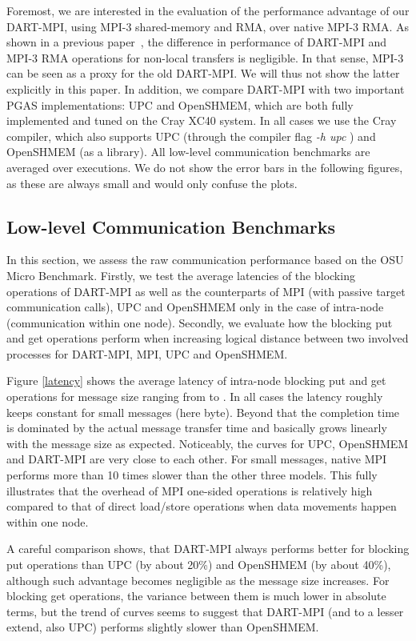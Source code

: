 \documentclass{llncs}
\newcommand{\MPI}[1]{\mbox{MPI-#1}\xspace}
\begin{document}
{Foremost, we are interested in the evaluation of the performance advantage of
our DART-MPI, using \MPI3 shared-memory and RMA, over native \MPI3
RMA. As shown in a previous paper~\cite{dart-mpi}, the
difference in performance of DART-MPI and MPI-3 RMA operations for non-local
transfers is negligible. In that sense, MPI-3 can be seen as a proxy
for the old DART-MPI. We will thus not show the latter explicitly in this paper.
In addition, we compare \mbox{DART-MPI} with two important PGAS implementations: UPC and OpenSHMEM, 
which are both fully implemented and tuned on the Cray XC40 system. 
In all cases we use the Cray compiler, which also supports UPC
(through the compiler flag \textit{-h upc} ) and OpenSHMEM (as a
library). 
All low-level communication benchmarks are averaged over  executions.
We do not show the error bars in the following figures, as these
are always small and would only confuse the plots.

\subsection{Low-level Communication Benchmarks}
In this section, we assess the raw communication performance based on the OSU Micro Benchmark\cite{osu_benchmark}.
Firstly, we test the average latencies of the blocking operations of \mbox{DART-MPI} 
as well as the counterparts of MPI (with passive target communication calls), UPC and OpenSHMEM\cite{openshmem} only in the case of intra-node (communication within one node).
Secondly, we evaluate how the blocking put and get operations perform when increasing
logical distance between two involved processes for DART-MPI, MPI, UPC and OpenSHMEM.

Figure \ref{latency} shows the average latency of intra-node blocking
put and get operations for message size ranging from  to
. In all cases the latency roughly keeps constant for small
messages (here  byte). Beyond that the completion time is
dominated by the actual message transfer time and basically grows
linearly with the message size as expected. Noticeably, the curves for
UPC, OpenSHMEM and DART-MPI are very close to each other. For small
messages, native MPI performs more than 10 times slower than the other three
models. This fully illustrates that the overhead of MPI one-sided
operations is relatively high compared to that of direct load/store operations
when data movements happen within one node.

A careful comparison shows, that DART-MPI always performs better for
blocking put operations than UPC (by about 20\%) and OpenSHMEM (by
about 40\%), although such advantage becomes negligible as the message
size increases. For blocking get operations, the variance between
them is much lower in absolute terms, but the trend of curves seems to
suggest that DART-MPI (and to a lesser extend, also UPC) performs slightly
slower than OpenSHMEM.

}
\end{document}
